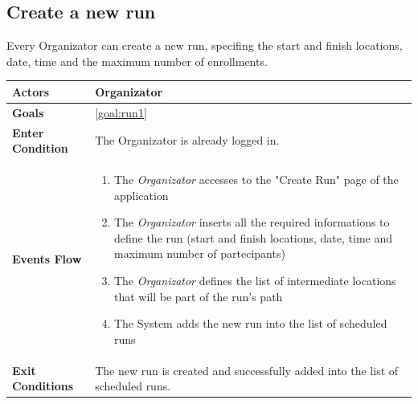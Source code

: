   \subsection{Create a new run}
Every Organizator can create a new run, specifing the start and finish locations, date, time and the maximum number of enrollments.

\begin{table}[H]
	\centering
    
    \begin{tabular}{|p{3.5cm}|p{10.3cm}|}
    
    \hline
    \textbf{\large{Actors}}  			& \tabitem Organizator 	\\
    				 					
    \hline
    \textbf{\large{Goals}} 				& \ref{goal:run1}\\
    
    \hline
    \textbf{\large{Enter Condition}}	& The Organizator is already logged in.		\\
    
    \hline
    \textbf{\large{Events Flow}}		& \begin{enumerate}[leftmargin=0.5cm]
                                          	\item The \emph{Organizator}  accesses to the "Create Run" page of the application
                                            \item The \emph{Organizator} inserts all the required informations to define the run (start and finish locations, date, time and maximum number of partecipants)
                                             \item The \emph{Organizator} defines the list of intermediate locations that will be part of the run's path
                                            \item The System adds the new run into the list of scheduled runs
                                           
                                          \end{enumerate}
    										\\
    \hline
    \textbf{\large{Exit Conditions}}    & The new run is created and successfully added into the list of scheduled runs.  \\
    

\end{tabular}
\end{table}
